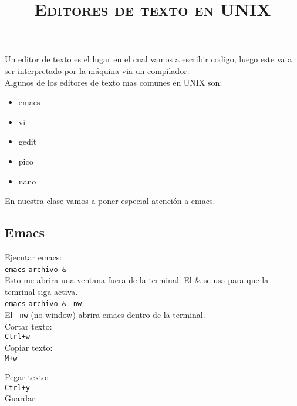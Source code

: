 \documentclass[12pt]{article}
\title{\textsc{Editores de texto en UNIX}}
\begin{document}
\date{}
\maketitle

Un editor de texto es el lugar en el cual vamos a escribir codigo, luego este va a ser interpretado 
por la m\'aquina via un compilador.\\

Algunos de los editores de texto mas comunes en UNIX son:

\begin{itemize}
\item emacs
\item vi 
\item gedit
\item pico 
\item nano 
\end{itemize}

En nuestra clase vamos a poner especial atenci\'on a emacs.

\begin{center}
\section*{Emacs}
\end{center}

Ejecutar emacs:\\

\texttt{emacs} \verb"archivo &"  \\

Esto me abrira una ventana fuera de la terminal. El $\&$ se usa para que la temrinal siga activa.\\

\texttt{emacs} \verb"archivo &" \texttt{-nw}  \\

El \texttt{-nw} (no window) abrira emacs dentro de la terminal.\\

Cortar texto:\\

\texttt{Ctrl+w}\\

Copiar texto:\\

\texttt{M+w}

Pegar texto:\\

\texttt{Ctrl+y}\\


Guardar:\\
\end{document}
